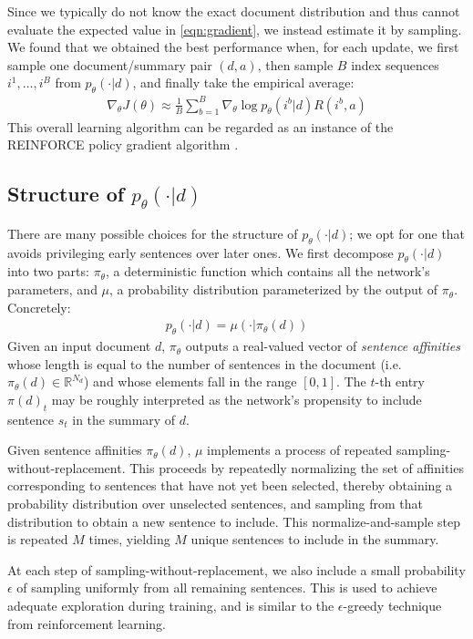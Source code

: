 \documentclass[11pt,a4paper]{article}
\begin{document}
Since we typically do not know the exact document distribution and thus cannot evaluate the expected value in \eqref{eqn:gradient}, we instead estimate it by sampling. We found that we obtained the best performance when, for each update, we first sample one document/summary pair $(d, a)$, then sample $B$ index sequences $i^1, \dots, i^B$ from $p_\theta(\cdot | d)$, and finally take the empirical average:
\begin{align}
    \nabla_\theta J(\theta) \approx \frac{1}{B} \sum_{b=1}^{B}\nabla_\theta \log p_\theta(i^b | d) R(i^b, a) \label{eqn:estimated-gradient}
\end{align}
This overall learning algorithm can be regarded as an instance of the REINFORCE policy gradient algorithm \citep{williams1992simple}.

\subsection{Structure of $p_\theta(\cdot|d)$}
There are many possible choices for the structure of $p_\theta(\cdot | d)$; we opt for one that avoids privileging early sentences over later ones. We first decompose $p_\theta(\cdot | d)$ into two parts: $\pi_\theta$, a deterministic function which contains all the network's parameters, and $\mu$, a probability distribution parameterized by the output of $\pi_\theta$. Concretely:
\begin{align}
    p_\theta(\cdot | d) = \mu(\cdot | \pi_\theta(d))
\end{align}
Given an input document $d$, $\pi_\theta$ outputs a real-valued vector of \textit{sentence affinities} whose length is equal to the number of sentences in the document (i.e. $\pi_\theta(d) \in \mathbb{R}^{N_d}$) and whose elements fall in the range $[0, 1]$. The $t$-th entry $\pi(d)_t$ may be roughly interpreted as the network's propensity to include sentence $s_t$ in the summary of $d$.

Given sentence affinities $\pi_\theta(d)$, $\mu$ implements a process of repeated sampling-without-replacement. This proceeds by repeatedly normalizing the set of affinities corresponding to sentences that have not yet been selected, thereby obtaining a probability distribution over unselected sentences, and sampling from that distribution to obtain a new sentence to include. This normalize-and-sample step is repeated $M$ times, yielding $M$ unique sentences to include in the summary.

At each step of sampling-without-replacement, we also include a small probability $\epsilon$ of sampling uniformly from all remaining sentences. This is used to achieve adequate exploration during training, and is similar to the $\epsilon$-greedy technique from reinforcement learning.
\end{document}
